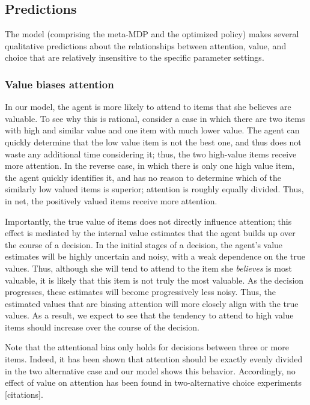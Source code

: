 \documentclass[12pt,a4paperpaper,]{article}
\begin{document}
\subsection{Predictions}\label{predictions}

The model (comprising the meta-MDP and the optimized policy) makes several qualitative predictions about the relationships between attention, value, and choice that are relatively insensitive to the specific parameter settings.

\subsubsection{Value biases attention}\label{value-biases-attention}

In our model, the agent is more likely to attend to items that she believes are valuable. To see why this is rational, consider a case in which there are two items with high and similar value and one item with much lower value. The agent can quickly determine that the low value item is not the best one, and thus does not waste any additional time considering it; thus, the two high-value items receive more attention. In the reverse case, in which there is only one high value item, the agent quickly identifies it, and has no reason to determine which of the similarly low valued items is superior; attention is roughly equally divided. Thus, in net, the positively valued items receive more attention.

Importantly, the true value of items does not directly influence attention; this effect is mediated by the internal value estimates that the agent builds up over the course of a decision. In the initial stages of a decision, the agent's value estimates will be highly uncertain and noisy, with a weak dependence on the true values. Thus, although she will tend to attend to the item she \emph{believes} is most valuable, it is likely that this item is not truly the most valuable. As the decision progresses, these estimates will become progressively less noisy. Thus, the estimated values that are biasing attention will more closely align with the true values. As a result, we expect to see that the tendency to attend to high value items should increase over the course of the decision.

Note that the attentional bias only holds for decisions between three or more items. Indeed, it has been shown that attention should be exactly evenly divided in the two alternative case \citep{Fudenberg2018} and our model shows this behavior. Accordingly, no effect of value on attention has been found in two-alternative choice experiments {[}citations{]}.
\end{document}
